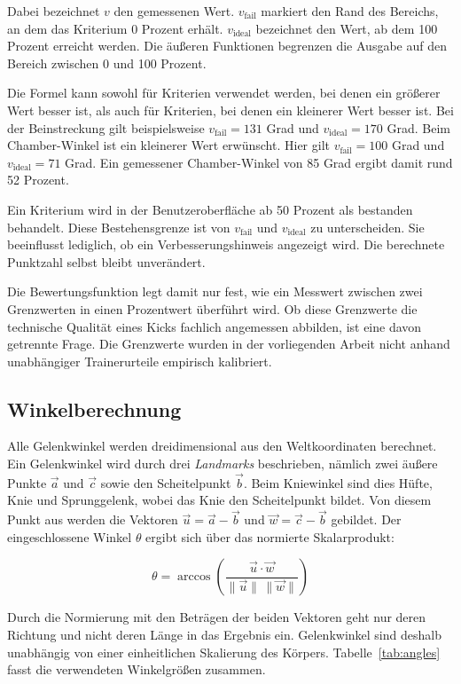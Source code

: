 \documentclass[intern]{cgMA}
\begin{document}
Dabei bezeichnet $v$ den gemessenen Wert. $v_{\text{fail}}$ markiert den Rand des Bereichs, an dem das Kriterium 0 Prozent erhält. $v_{\text{ideal}}$ bezeichnet den Wert, ab dem 100 Prozent erreicht werden. Die äußeren Funktionen begrenzen die Ausgabe auf den Bereich zwischen 0 und 100 Prozent.

Die Formel kann sowohl für Kriterien verwendet werden, bei denen ein größerer Wert besser ist, als auch für Kriterien, bei denen ein kleinerer Wert besser ist. Bei der Beinstreckung gilt beispielsweise $v_{\text{fail}}=131$ Grad und $v_{\text{ideal}}=170$ Grad. Beim Chamber-Winkel ist ein kleinerer Wert erwünscht. Hier gilt $v_{\text{fail}}=100$ Grad und $v_{\text{ideal}}=71$ Grad. Ein gemessener Chamber-Winkel von 85 Grad ergibt damit rund 52 Prozent.

Ein Kriterium wird in der Benutzeroberfläche ab 50 Prozent als bestanden behandelt. Diese Bestehensgrenze ist von $v_{\text{fail}}$ und $v_{\text{ideal}}$ zu unterscheiden. Sie beeinflusst lediglich, ob ein Verbesserungshinweis angezeigt wird. Die berechnete Punktzahl selbst bleibt unverändert.

Die Bewertungsfunktion legt damit nur fest, wie ein Messwert zwischen zwei Grenzwerten in einen Prozentwert überführt wird. Ob diese Grenzwerte die technische Qualität eines Kicks fachlich angemessen abbilden, ist eine davon getrennte Frage. Die Grenzwerte wurden in der vorliegenden Arbeit nicht anhand unabhängiger Trainerurteile empirisch kalibriert.

\subsection{Winkelberechnung}
Alle Gelenkwinkel werden dreidimensional aus den Weltkoordinaten berechnet. Ein Gelenkwinkel wird durch drei \textit{Landmarks} beschrieben, nämlich zwei äußere Punkte $\vec{a}$ und $\vec{c}$ sowie den Scheitelpunkt $\vec{b}$. Beim Kniewinkel sind dies Hüfte, Knie und Sprunggelenk, wobei das Knie den Scheitelpunkt bildet. Von diesem Punkt aus werden die Vektoren $\vec{u}=\vec{a}-\vec{b}$ und $\vec{w}=\vec{c}-\vec{b}$ gebildet. Der eingeschlossene Winkel $\theta$ ergibt sich über das normierte Skalarprodukt:

\begin{equation}
\theta = \arccos\!\left(\frac{\vec{u}\cdot\vec{w}}{\lVert\vec{u}\rVert\,\lVert\vec{w}\rVert}\right)
\label{eq:angle3d}
\end{equation}

Durch die Normierung mit den Beträgen der beiden Vektoren geht nur deren Richtung und nicht deren Länge in das Ergebnis ein. Gelenkwinkel sind deshalb unabhängig von einer einheitlichen Skalierung des Körpers. Tabelle~\ref{tab:angles} fasst die verwendeten Winkelgrößen zusammen.
\end{document}
